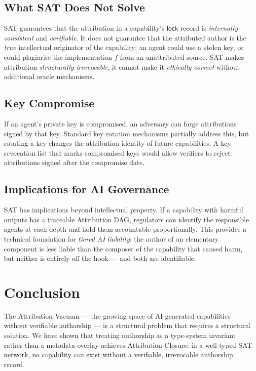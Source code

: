 \documentclass[12pt]{article}
\newcommand{\LOCK}{\mathsf{lock}}
\begin{document}
\subsection{What SAT Does Not Solve}

SAT guarantees that the attribution in a capability's $\LOCK$ record is
\emph{internally consistent} and \emph{verifiable}.  It does not guarantee
that the attributed author is the \emph{true} intellectual originator of the
capability: an agent could use a stolen key, or could plagiarise the
implementation $f$ from an unattributed source.  SAT makes attribution
\emph{structurally irrevocable}; it cannot make it \emph{ethically correct}
without additional oracle mechanisms.

\subsection{Key Compromise}

If an agent's private key is compromised, an adversary can forge attributions
signed by that key.  Standard key rotation mechanisms partially address this,
but rotating a key changes the attribution identity of future capabilities.
A key revocation list that marks compromised keys would allow verifiers to
reject attributions signed after the compromise date.

\subsection{Implications for AI Governance}

SAT has implications beyond intellectual property.  If a capability with harmful
outputs has a traceable Attribution DAG, regulators can identify the responsible
agents at each depth and hold them accountable proportionally.  This provides a
technical foundation for \emph{tiered AI liability}: the author of an elementary
component is less liable than the composer of the capability that caused harm,
but neither is entirely off the hook — and both are identifiable.

\section{Conclusion}
\label{sec:conclusion}

The Attribution Vacuum — the growing space of AI-generated capabilities without
verifiable authorship — is a structural problem that requires a structural
solution.  We have shown that treating authorship as a type-system invariant
rather than a metadata overlay achieves Attribution Closure: in a well-typed
SAT network, no capability can exist without a verifiable, irrevocable
authorship record.
\end{document}
